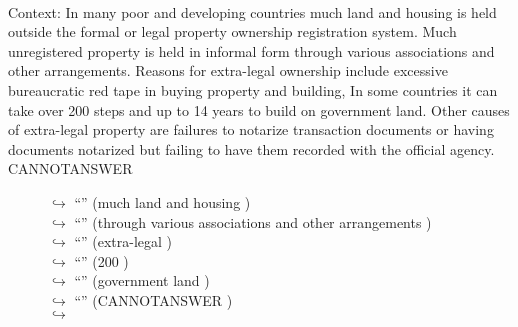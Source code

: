 \documentclass[11pt,a4paper, onecolumn]{article}
\begin{document}
\\ Context: In many poor and developing countries much land and housing is held outside the formal or legal property ownership registration system. Much unregistered property is held in informal form through various associations and other arrangements. Reasons for extra-legal ownership include excessive bureaucratic red tape in buying property and building, In some countries it can take over 200 steps and up to 14 years to build on government land. Other causes of extra-legal property are failures to notarize transaction documents or having documents notarized but failing to have them recorded with the official agency. CANNOTANSWER

\begin{figure}[t] \small \begin{tcolorbox}[boxsep=0pt,left=5pt,right=0pt,top=2pt,colback = yellow!5] \begin{dialogue}
 \small 
\colorbox{pink!25}{$\hookrightarrow$}
{ ``'' (much land and housing ) }
\\
\colorbox{pink!25}{$\hookrightarrow$}
{ ``'' (through various associations and other arrangements ) }
\\
\colorbox{pink!25}{$\hookrightarrow$}
{ ``'' (extra-legal ) }
\\
\colorbox{pink!25}{$\hookrightarrow$}
{ ``'' (200 ) }
\\
\colorbox{pink!25}{$\hookrightarrow$}
{ ``'' (government land ) }
\\
\colorbox{pink!25}{$\hookrightarrow$}
{ ``'' (CANNOTANSWER ) }
\\
\colorbox{pink!25}{$\hookrightarrow$}

\end{dialogue}
\end{tcolorbox}
\end{figure}
\end{document}

